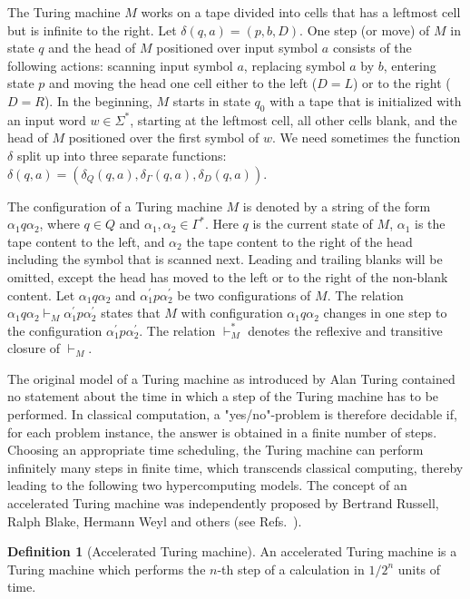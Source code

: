 \documentclass[pre,showpacs,showkeys,preprint]{revtex4}
\theoremstyle{definition}
\newtheorem{defn}{Definition}
\begin{document}
The Turing machine $M$ works on a tape divided into cells that has a leftmost cell but is infinite to the right.
Let $\delta(q, a) = (p, b, D)$.
One step (or move) of $M$ in state $q$ and the head of $M$ positioned over input symbol $a$
consists of the following actions:
scanning input symbol $a$, replacing symbol $a$ by $b$,
entering state $p$ and moving the head one cell either to the left ($D=L$) or to the right ($D=R$).
In the beginning, $M$ starts in state $q_0$ with a tape that is initialized with an input word $w \in \Sigma^*$,
starting at the leftmost cell, all other cells blank,
and the head of $M$ positioned over the first symbol of $w$.
We need sometimes the function $\delta$ split up into three separate functions:
$\delta(q,a) = (\delta_Q(q,a), \delta_\Gamma(q,a), \delta_D(q,a))$.

The configuration of a Turing machine $M$ is denoted by a string of the form
$\alpha_1 q \alpha_2$, where $q \in Q$ and $\alpha_1, \alpha_2 \in \Gamma^*$.
Here $q$ is the current state of $M$, $\alpha_1$ is the tape content to the left,
and $\alpha_2$ the tape content to the right of the head including the symbol that is scanned next.
Leading and trailing blanks will be omitted, except the head has moved to the left or to the right of
the non-blank content.
Let $\alpha_1 q \alpha_2$ and  $\alpha_1^\prime p \alpha_2^\prime$ be two configurations of $M$.
The relation $\alpha_1 q \alpha_2 \vdash_M \alpha_1^\prime p \alpha_2^\prime$ states
that $M$ with configuration $\alpha_1 q \alpha_2$ changes in one step
to the configuration $\alpha_1^\prime p \alpha_2^\prime$.
The relation $\vdash_M^*$ denotes the reflexive and transitive closure of $\vdash_M$.

The original model of a Turing machine as introduced by Alan Turing contained no statement about the time in which a
step of the Turing machine has to be performed.
In classical computation, a "yes/no"-problem is therefore decidable if, for each problem instance, the answer is obtained
in a finite number of steps.
Choosing an appropriate time scheduling, the Turing machine can perform infinitely many steps in finite time, which
transcends classical computing,
thereby leading to the following two hypercomputing models.
The concept of an accelerated Turing machine was independently proposed by Bertrand Russell, Ralph Blake,
Hermann Weyl and others (see Refs.~\cite{ord-2006,potgieter-06}).

\begin{defn}[Accelerated Turing machine]
An accelerated Turing machine is a Turing machine which performs the $n$-th step of a calculation in $1/2^n$ units of time.
\end{defn}
\end{document}
